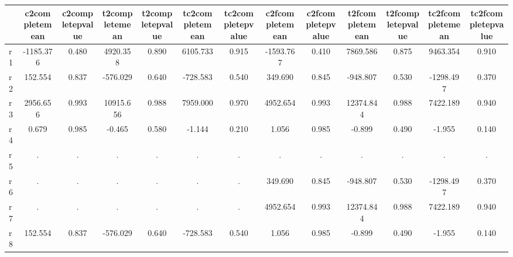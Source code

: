 \begin{table}[htbp]
\begin{tabular}{lcccccccccccc} \hline \hline
 & c2completemean  & c2completepvalue  & t2completemean  & t2completepvalue  & tc2completemean  & tc2completepvalue  & c2fcompletemean  & c2fcompletepvalue  & t2fcompletemean  & t2fcompletepvalue  & tc2fcompletemean  & tc2fcompletepvalue  \\  \hline 
r1 & -1185.376 &     0.480 &  4920.358 &     0.890 &  6105.733 &     0.915 & -1593.767 &     0.410 &  7869.586 &     0.875 &  9463.354 &     0.910 \\  
r2 &   152.554 &     0.837 &  -576.029 &     0.640 &  -728.583 &     0.540 &   349.690 &     0.845 &  -948.807 &     0.530 & -1298.497 &     0.370 \\  
r3 &  2956.656 &     0.993 & 10915.656 &     0.988 &  7959.000 &     0.970 &  4952.654 &     0.993 & 12374.844 &     0.988 &  7422.189 &     0.940 \\  
r4 &     0.679 &     0.985 &    -0.465 &     0.580 &    -1.144 &     0.210 &     1.056 &     0.985 &    -0.899 &     0.490 &    -1.955 &     0.140 \\  
r5 &         . &         . &         . &         . &         . &         . &         . &         . &         . &         . &         . &         . \\  
r6 &         . &         . &         . &         . &         . &         . &   349.690 &     0.845 &  -948.807 &     0.530 & -1298.497 &     0.370 \\  
r7 &         . &         . &         . &         . &         . &         . &  4952.654 &     0.993 & 12374.844 &     0.988 &  7422.189 &     0.940 \\  
r8 &   152.554 &     0.837 &  -576.029 &     0.640 &  -728.583 &     0.540 &     1.056 &     0.985 &    -0.899 &     0.490 &    -1.955 &     0.140 \\  
\hline \hline \end{tabular}
\end{table}
